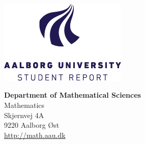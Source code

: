 

~
\thispagestyle{empty}

\begin{minipage}[t]{0.48\textwidth}
\vspace*{-25pt}			%
\includegraphics[height=4cm]{Formalia/AAU-logo-stud-ENG.png}
\end{minipage}
\hfill
\begin{minipage}[t]{0.48\textwidth}
{\small 
\textbf{Department of Mathematical Sciences}\\
Mathematics\\
Skjernvej 4A \\
9220 Aalborg Øst \\
\href{http://math.aau.dk}{http://math.aau.dk}}
\end{minipage}

\vspace*{1cm}

